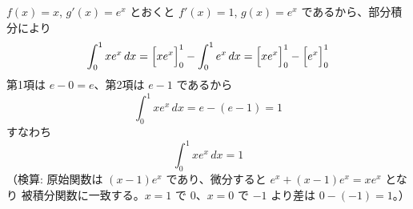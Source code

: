 
$f(x) = x$, $g'(x) = e^{x}$ とおくと $f'(x) = 1$, $g(x) = e^{x}$ であるから、部分積分により
\[
\int_{0}^{1} x e^{x}\,dx
= \Bigl[x e^{x}\Bigr]_{0}^{1} - \int_{0}^{1} e^{x}\,dx
= \Bigl[x e^{x}\Bigr]_{0}^{1} - \Bigl[e^{x}\Bigr]_{0}^{1}
\]
第1項は $e - 0 = e$、第2項は $e - 1$ であるから
\[
\int_{0}^{1} x e^{x}\,dx = e - (e-1) = 1
\]
すなわち
\[
\boxed{\; \int_{0}^{1} x e^{x}\,dx = 1 \;}
\]
（検算: 原始関数は $(x-1)e^{x}$ であり、微分すると $e^{x} + (x-1)e^{x} = x e^{x}$ となり
被積分関数に一致する。$x=1$ で $0$、$x=0$ で $-1$ より差は $0-(-1)=1$。）
